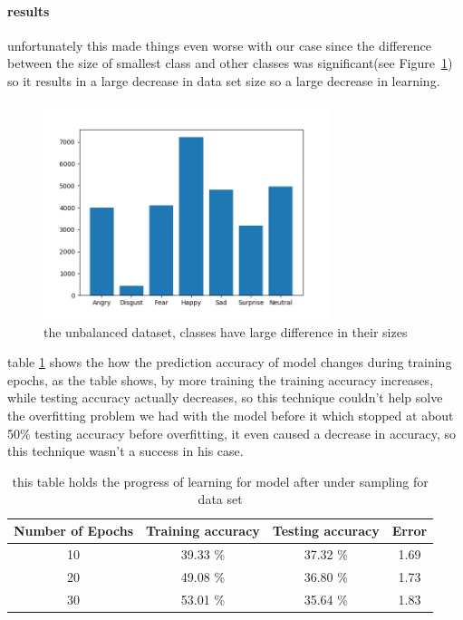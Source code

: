 \paragraph{results}
unfortunately this made things even worse with our case since the difference between the size of smallest class and other classes was significant(see Figure~\ref{fig:dataset}) so it results in a large decrease in data set size so a large decrease in learning. \newline
\begin{figure}
	\centering
	\includegraphics[width=0.75\textwidth]{CH2-Review/sec1_preprocessing/dataset_distribution.png}
	\caption{the unbalanced dataset, classes have large difference in their sizes}
	\label{fig:dataset}
\end{figure}
table \ref{tab:table1} shows the how the prediction accuracy of model changes during training epochs, as the table shows, by more training the training accuracy increases, while testing accuracy actually decreases, so this technique couldn't help solve the overfitting problem we had with the model before it which stopped at about 50\% testing accuracy before overfitting, it even caused a decrease in accuracy, so this technique wasn't a success in his case. 
\begin{table}[h!]
	\centering
	\caption{this table holds the progress of learning for model after under sampling for data set}
	\label{tab:table1}
	\begin{tabular}{c | c | c | c}
		\textbf{Number of Epochs} & \textbf{Training accuracy} & \textbf{Testing accuracy} & \textbf{Error}\\ \hline 
		10 & 39.33 \% & 37.32 \% & 1.69 \\
		20 & 49.08 \% & 36.80 \% & 1.73 \\
		30 & 53.01 \% & 35.64 \% & 1.83 \\
	\end{tabular}
\end{table}